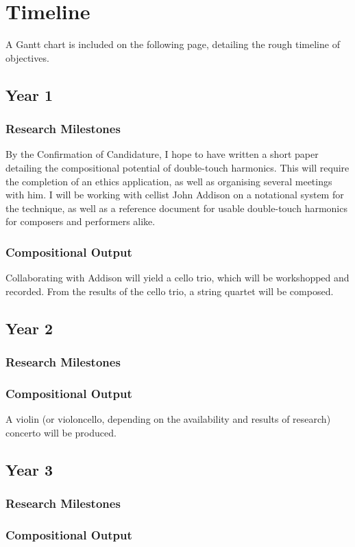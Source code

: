 \section{Timeline}
A Gantt chart is included on the following page, detailing the rough timeline of objectives.
\subsection{Year 1}
\subsubsection{Research Milestones}
By the Confirmation of Candidature, I hope to have written a short paper detailing the compositional potential of double-touch harmonics.
This will require the completion of an ethics application, as well as organising several meetings with him.
I will be working with cellist John Addison on a notational system for the technique, as well as a reference document for usable double-touch harmonics for composers and performers alike.
\subsubsection{Compositional Output}
Collaborating with Addison will yield a cello trio, which will be workshopped and recorded.
From the results of the cello trio, a string quartet will be composed. 
\subsection{Year 2}
\subsubsection{Research Milestones}

\subsubsection{Compositional Output}
A violin (or violoncello, depending on the availability and results of research) concerto will be produced.
\subsection{Year 3}
\subsubsection{Research Milestones}
\subsubsection{Compositional Output}
